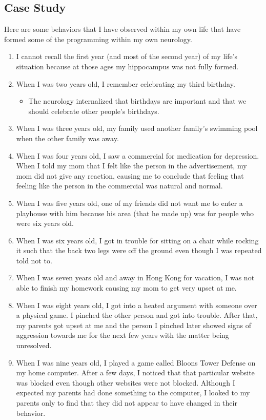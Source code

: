 \documentclass[a4paper, 12pt]{article}
\begin{document}
\subsection{Case Study}
Here are some behaviors that I have observed within my own life that have formed some of the programming within my own neurology.
\begin{enumerate}
  \item I cannot recall the first year (and most of the second year) of my life's situation because at those ages my hippocampus was not fully formed.
  \item When I was two years old, I remember celebrating my third birthday.
  \begin{itemize}
    \item The neurology internalized that birthdays are important and that we should celebrate other people's birthdays.
  \end{itemize}
  \item When I was three years old, my family used another family's swimming pool when the other family was away.
  \item When I was four years old, I saw a commercial for medication for depression. When I told my mom that I felt like the person in the advertisement, my mom did not give any reaction, causing me to conclude that feeling that feeling like the person in the commercial was natural and normal.
  \item When I was five years old, one of my friends did not want me to enter a playhouse with him because his area (that he made up) was for people who were six years old.
  \item When I was six years old, I got in trouble for sitting on a chair while rocking it such that the back two legs were off the ground even though I was repeated told not to.
  \item When I was seven years old and away in Hong Kong for vacation, I was not able to finish my homework causing my mom to get very upset at me.
  \item When I was eight years old, I got into a heated argument with someone over a physical game. I pinched the other person and got into trouble. After that, my parents got upset at me and the person I pinched later showed signs of aggression towards me for the next few years with the matter being unresolved.
  \item When I was nine years old, I played a game called Bloons Tower Defense on my home computer. After a few days, I noticed that that particular website was blocked even though other websites were not blocked. Although I expected my parents had done something to the computer, I looked to my parents only to find that they did not appear to have changed in their behavior.

\end{enumerate}
\end{document}
